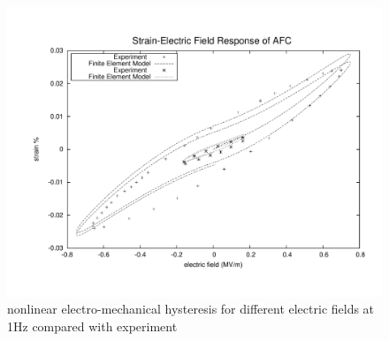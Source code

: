 \begin{figure} 
\centering
\includegraphics[trim = 0mm 0mm 0mm 0mm,width=5.0in]
{./chap_4_structural_analyses/afc_unit_cell/non_linear_hysteris_afc/non_linear_electric_field_vs_polarization.pdf}
\caption{nonlinear electro-mechanical hysteresis for different electric fields at 1Hz compared with experiment}
\label{fig:non_linear_electric_field_vs_polarization}
\end{figure}



\clearpage